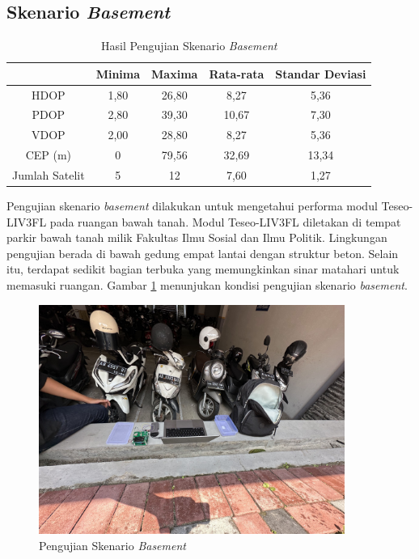 \subsection{Skenario \textit{Basement}}
\begin{table}[H]
	\caption{Hasil Pengujian Skenario \textit{Basement}}
	\vspace{0.5em}
	\centering
	\begin{tabular}{ccccc}
		\hline
		& \textbf{Minima} & \textbf{Maxima} & \textbf{Rata-rata} & \textbf{Standar Deviasi}\\
		\hline 
		HDOP & 1,80 & 26,80 & 8,27 & 5,36\\
		PDOP & 2,80 & 39,30 & 10,67 & 7,30\\
		VDOP & 2,00 & 28,80 & 8,27 & 5,36\\
		CEP (m) & 0 & 79,56 & 32,69 & 13,34\\
		Jumlah Satelit & 5 & 12 & 7,60 & 1,27\\
		\hline
	\end{tabular}
	\label{Tab: basement-table}
\end{table}

Pengujian skenario \textit{basement} dilakukan untuk mengetahui performa modul Teseo-LIV3FL pada ruangan bawah tanah. Modul Teseo-LIV3FL diletakan di tempat parkir bawah tanah milik Fakultas Ilmu Sosial dan Ilmu Politik. Lingkungan pengujian berada di bawah gedung empat lantai dengan struktur beton. Selain itu, terdapat sedikit bagian terbuka yang memungkinkan sinar matahari untuk memasuki ruangan. Gambar \ref{Fig: basement-keadaan} menunjukan kondisi pengujian skenario \textit{basement}.

\begin{figure}[H]
	\centering
	\includegraphics[width=10cm]{contents/chapter-4/1-skenario-basement/keadaan.jpg}
	\caption{Pengujian Skenario \textit{Basement}}
	\label{Fig: basement-keadaan}
\end{figure}

